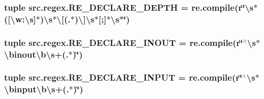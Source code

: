 \hypertarget{namespacesrc_1_1regex_aab8c4627b6f16cd59c1667e4cd90e52b}{
\subsubsection[{R\-E\-\_\-\-D\-E\-C\-L\-A\-R\-E\-\_\-\-D\-E\-P\-T\-H}]{\setlength{\rightskip}{0pt plus 5cm}tuple src.\-regex.\-R\-E\-\_\-\-D\-E\-C\-L\-A\-R\-E\-\_\-\-D\-E\-P\-T\-H = re.\-compile(r\char`\"{}\textbackslash{}s$\ast$(\mbox{[}\textbackslash{}w\-:\textbackslash{}s\mbox{]}$\ast$)\textbackslash{}s$\ast$\textbackslash{}\mbox{[}(.$\ast$)\textbackslash{}\mbox{]}\textbackslash{}s$\ast$\mbox{[};\mbox{]}$\ast$\textbackslash{}s$\ast$\char`\"{})}}\label{namespacesrc_1_1regex_aab8c4627b6f16cd59c1667e4cd90e52b}
\hypertarget{namespacesrc_1_1regex_ac8f184a8578c268d75dd3a6a3d87e8bb}{
\subsubsection[{R\-E\-\_\-\-D\-E\-C\-L\-A\-R\-E\-\_\-\-I\-N\-O\-U\-T}]{\setlength{\rightskip}{0pt plus 5cm}tuple src.\-regex.\-R\-E\-\_\-\-D\-E\-C\-L\-A\-R\-E\-\_\-\-I\-N\-O\-U\-T = re.\-compile(r\char`\"{}$^\wedge$\textbackslash{}s$\ast$\textbackslash{}binout\textbackslash{}b\textbackslash{}s+(.$\ast$)\char`\"{})}}\label{namespacesrc_1_1regex_ac8f184a8578c268d75dd3a6a3d87e8bb}
\hypertarget{namespacesrc_1_1regex_aa867c52851d888ca67312cd7c32fb4aa}{
\subsubsection[{R\-E\-\_\-\-D\-E\-C\-L\-A\-R\-E\-\_\-\-I\-N\-P\-U\-T}]{\setlength{\rightskip}{0pt plus 5cm}tuple src.\-regex.\-R\-E\-\_\-\-D\-E\-C\-L\-A\-R\-E\-\_\-\-I\-N\-P\-U\-T = re.\-compile(r\char`\"{}$^\wedge$\textbackslash{}s$\ast$\textbackslash{}binput\textbackslash{}b\textbackslash{}s+(.$\ast$)\char`\"{})}}\label{namespacesrc_1_1regex_aa867c52851d888ca67312cd7c32fb4aa}
